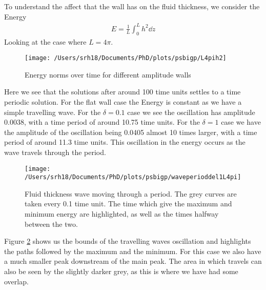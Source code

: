 \documentclass{jfm}
\begin{document}
To understand the affect that the wall has on the fluid thickness, we consider the Energy 
\begin{align}
	E = \frac{1}{L}\int_0^L h^2\dd{z}
\end{align}
Looking at the case where $L = 4\pi$.
\begin{figure}
	\vspace{.25cm}
	\centering
	\texttt{[image: /Users/srh18/Documents/PhD/plots/psbigp/L4pih2]}
	\caption{Energy norms over time for different amplitude walls}
	\label{4pih2}
\end{figure}
Here we see that the solutions after around 100 time units settles to a time periodic solution. For the flat wall case the Energy is constant as we have a simple travelling wave. For the $\delta = 0.1$ case we see the oscillation has amplitude 0.0038, with a time period of  around 10.75 time units.
For the $\delta = 1$ case we have the amplitude of the oscillation being 0.0405 almost 10 times larger, with a time period of  around 11.3 time units. This oscillation in the energy occurs as the wave travels through the period. 
\begin{figure}
	\vspace{.25cm}
	\centering
	\texttt{[image: /Users/srh18/Documents/PhD/plots/psbigp/waveperioddel1L4pi]}
	\caption{Fluid thickness wave moving through a period. The grey curves are taken every 0.1 time unit. The time which give the maximum and minimum energy are highlighted, as well as the times halfway between the two.}
	\label{waveperiod}
\end{figure}
Figure \ref{waveperiod} shows us the bounds of the travelling waves oscillation and highlights the paths followed by the maximum and the minimum. For this case we also have a much smaller peak downstream of the main peak. The area in which travels can also be seen by the slightly darker grey, as this is where we have had some overlap. 
	
\end{document}
